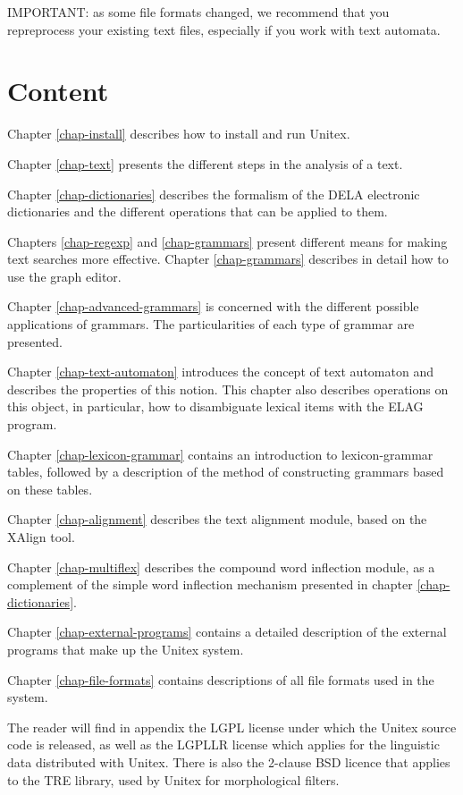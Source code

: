 \bigskip
\noindent IMPORTANT: as some file formats changed, we recommend that you
repreprocess your existing text files, especially if you work with text
automata.

\section*{Content}
\noindent Chapter \ref{chap-install} describes how to install and run
Unitex.

\bigskip \noindent Chapter \ref{chap-text} presents the different steps in the
analysis of  a text.

\bigskip \noindent Chapter \ref{chap-dictionaries} describes the formalism of
the DELA electronic dictionaries and the different operations that can be applied to them.

\bigskip \noindent Chapters \ref{chap-regexp} and \ref{chap-grammars}
present different means for making text searches more effective. 
Chapter \ref{chap-grammars} describes in detail how to use the graph
editor.

\bigskip \noindent Chapter \ref{chap-advanced-grammars} is concerned
with the different possible applications of grammars. The particularities of each type of grammar are
presented.

\bigskip \noindent Chapter \ref{chap-text-automaton} introduces the 
concept of text automaton and describes the properties of this notion. This chapter also describes 
operations on this object, in particular, how to disambiguate lexical items with
the ELAG program.

\bigskip \noindent Chapter \ref{chap-lexicon-grammar} contains an
introduction to lexicon-grammar tables, followed by a description of the method of constructing grammars based on these
tables.

\bigskip \noindent Chapter \ref{chap-alignment} describes the text
alignment module, based on the XAlign tool.

\bigskip \noindent Chapter \ref{chap-multiflex} describes the compound word
inflection module, as a complement of the simple word inflection mechanism
presented in chapter \ref{chap-dictionaries}.

\bigskip \noindent Chapter \ref{chap-external-programs} contains a
detailed description of the external programs that make up the Unitex system.

\bigskip \noindent Chapter \ref{chap-file-formats} contains
descriptions of all file formats used in the system. 


\bigskip \noindent The reader will find in appendix the LGPL license
under which the Unitex source code is released, as well as the LGPLLR license
which applies for the linguistic data distributed with Unitex. There is also
the 2-clause BSD licence that applies to the TRE library, used by Unitex for 
morphological filters.
